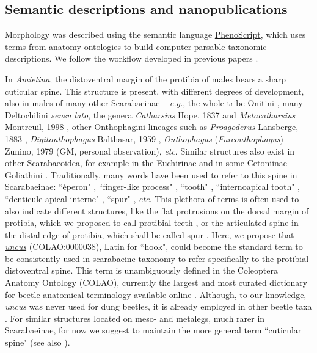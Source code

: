 \documentclass[fleqn,10pt,lineno]{wlpeerj}
\begin{document}
\subsection*{Semantic descriptions and nanopublications}

Morphology was described using the semantic language \href{https://github.com/sergeitarasov/PhenoScript}{PhenoScript}, which uses terms from anatomy ontologies to build computer-parsable taxonomic descriptions. We follow the workflow developed in previous papers \citep{montanaro2024beyond, montanaro2024computable}.

In \textit{Amietina}, the distoventral margin of the protibia of males bears a sharp cuticular spine. This structure is present, with different degrees of development, also in males of many other Scarabaeinae – {\textit{e.g.}}, the whole tribe Onitini \citep{janssens1937revision}, many Deltochilini \textit{sensu lato}, the genera \textit{Catharsius} Hope, 1837 and \textit{Metacatharsius} Montreuil, 1998 \citep{scholtz1987revision, tarasov2015innovative}, other Onthophagini lineages such as \textit{Proagoderus} Lansberge, 1883 \citep{palestrini1992sistematica}, \textit{Digitonthophagus} Balthasar, 1959 \citep{genier2017digitonthophagus}, \textit{Onthophagus} (\textit{Furconthophagus}) Zunino, 1979 (GM, personal observation), \textit{etc}. Similar structures also exist in other Scarabaeoidea, for example in the Euchirinae \citep{young1989euchirinae} and in some Cetoniinae Goliathini \citep{de2024taxonomic}. Traditionally, many words have been used to refer to this spine in Scarabaeinae: ``éperon" \citep{janssens1937revision}, ``finger-like process" \citep{krikken1977notes}, ``tooth" \citep{genier2019new}, ``internoapical tooth" \citep{genier2017digitonthophagus}, ``denticule apical interne" \citep{dierkens2023gonionthophagus}, ``spur" \citep{scholtz1987revision}, \textit{etc}. This plethora of terms is often used to also indicate different structures, like the flat protrusions on the dorsal margin of protibia, which we proposed to call \href{https://ontobee.org/ontology/AISM?iri=http://purl.obolibrary.org/obo/AISM_0000366}{protibial teeth} \citep{montanaro2024computable}, or the articulated spine in the distal edge of protibia, which shall be called \href{https://ontobee.org/ontology/AISM?iri=http://purl.obolibrary.org/obo/AISM_0000040}{spur} \citep{giron2024AISM}. Here, we propose that \href{https://ontobee.org/ontology/COLAO?iri=http://purl.obolibrary.org/obo/COLAO_0000038}{\textit{uncus}} (COLAO:0000038), Latin for ``hook", could become the standard term to be consistently used in scarabaeine taxonomy to refer specifically to the protibial distoventral spine. This term is unambiguously defined in the Coleoptera Anatomy Ontology (COLAO), currently the largest and most curated dictionary for beetle anatomical terminology available online \citep{giron2024colao}. Although, to our knowledge, \textit{uncus} was never used for dung beetles, it is already employed in other beetle taxa \citep{lawrence2013australian}. For similar structures located on meso- and metalegs, much rarer in Scarabaeinae, for now we suggest to maintain the more general term ``cuticular spine" (see also \citep{montanaro2024beyond}).
\end{document}
